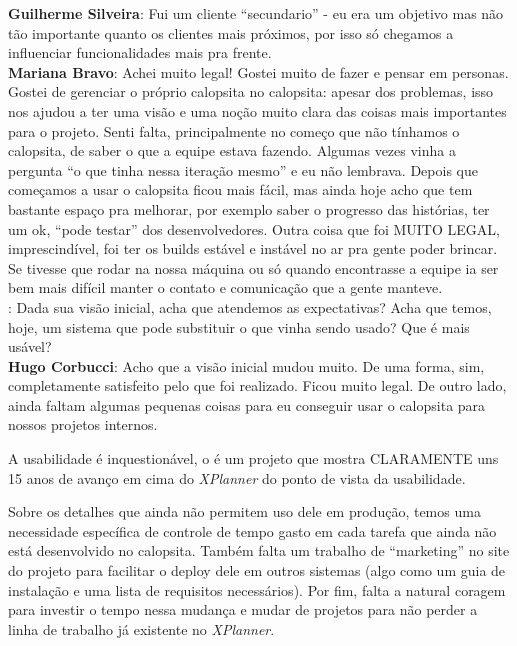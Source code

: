 \textbf{Guilherme Silveira}: Fui um cliente ``secundario'' - eu era um objetivo mas não tão importante quanto os clientes mais próximos, por isso só chegamos a influenciar funcionalidades mais pra frente. \\

\textbf{Mariana Bravo}: Achei muito legal!
Gostei muito de fazer e pensar em personas. Gostei de gerenciar o próprio calopsita no calopsita: apesar dos problemas, isso nos ajudou a ter uma visão e uma noção muito clara das coisas mais importantes para o projeto.
Senti falta, principalmente no começo que não tínhamos o calopsita, de saber o que a equipe estava fazendo. Algumas vezes vinha a pergunta ``o que tinha nessa iteração mesmo'' e eu não lembrava.
Depois que começamos a usar o calopsita ficou mais fácil, mas ainda hoje acho que tem bastante espaço pra melhorar, por exemplo saber o progresso das histórias, ter um ok, ``pode testar'' dos desenvolvedores.
Outra coisa que foi MUITO LEGAL, imprescindível, foi ter os builds estável e instável no ar pra gente poder brincar. Se tivesse que rodar na nossa máquina ou só quando encontrasse a equipe ia ser bem mais difícil manter o contato e comunicação que a gente manteve. \\

\textbf{\calopsita{}}: Dada sua visão inicial, acha que atendemos as expectativas? Acha que temos, hoje, um sistema que pode substituir o que vinha sendo usado? Que é mais usável?\\

\textbf{Hugo Corbucci}: Acho que a visão inicial mudou muito. De uma forma, sim, completamente satisfeito pelo que foi realizado. Ficou muito legal. De outro lado, ainda faltam algumas pequenas coisas para eu conseguir usar o calopsita para nossos projetos internos.

A usabilidade é inquestionável, o \calopsita{} é um projeto que mostra CLARAMENTE uns 15 anos de avanço em cima do \textit{XPlanner} do ponto de vista da usabilidade.

Sobre os detalhes que ainda não permitem uso dele em produção, temos uma necessidade específica de controle de tempo gasto em cada tarefa que ainda não está desenvolvido no calopsita. Também falta um trabalho de ``marketing'' no site do projeto para facilitar o deploy dele em outros sistemas (algo como um guia de instalação e uma lista de requisitos necessários). Por fim, falta a natural coragem para investir o tempo nessa mudança e mudar de projetos para não perder a linha de trabalho já existente no \textit{XPlanner}.\\

